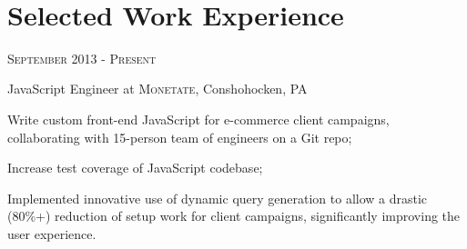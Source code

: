 \documentclass[10pt]{article} %
\begin{document}
\color{text1} %


\par{
\\ 

	

\begin{minipage}[t]{0.5\textwidth}
\vspace{20pt} %
	

\section{Selected Work Experience} 


{\raggedleft\textsc{September 2013 - Present}\par}

{\raggedright\large JavaScript Engineer at \textsc{Monetate}, Conshohocken, PA\\

\begin{itemize} 
\normalsize{\item Write custom front-end JavaScript for e-commerce client campaigns, collaborating with 15-person team of engineers on a Git repo; \item Increase test coverage of JavaScript codebase; \item Implemented innovative use of dynamic query generation to allow a drastic (80\%+) reduction of setup work for client campaigns, significantly improving the user experience. }\\
\end{itemize}

}
\end{minipage}}
\end{document}
